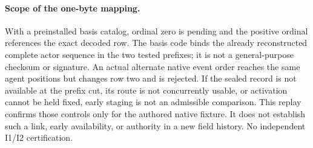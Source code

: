 \documentclass{article}
\begin{document}
\paragraph{Scope of the one-byte mapping.}
With a preinstalled basis catalog, ordinal zero is pending and the
positive ordinal references the exact decoded row. The basis code
binds the already reconstructed complete actor sequence in the two
tested prefixes; it is not a general-purpose checksum or signature.
An actual alternate native event order reaches the same agent
positions but changes row two and is rejected. If the sealed record is
not available at the prefix cut, its route is not concurrently usable,
or activation cannot be held fixed, early staging is not an admissible
comparison. This replay confirms those controls only for the authored
native fixture. It does not establish such a link, early availability,
or authority in a new field history. No independent I1/I2 certification.
\end{document}
